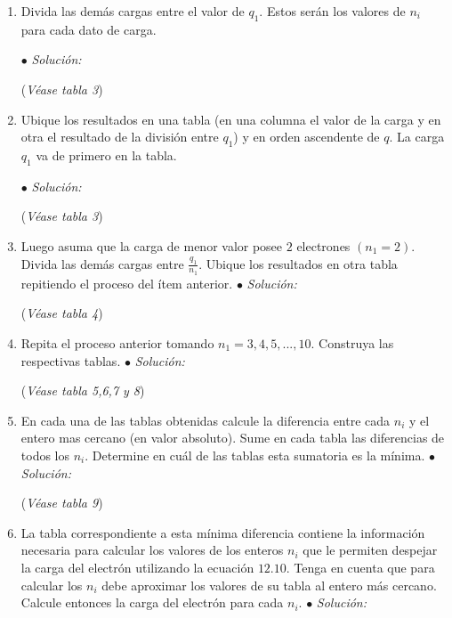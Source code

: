 \documentclass{article}
\begin{document}
\begin{enumerate}
    \item Divida las demás cargas entre el valor de $q_{1}$. Estos serán los valores de $n_{i}$ para cada dato de carga.\newline
    
$\bullet$ \emph{Solución: }\newline

(\emph{Véase tabla 3})

    \item Ubique los resultados en una tabla (en una columna el valor de la carga y en otra el resultado de la división entre $q_{1}$) y en orden ascendente de $q$. La carga $q_{1}$ va de primero en la tabla.\newline
    
$\bullet$ \emph{Solución: }\newline

(\emph{Véase tabla 3})



    \item Luego asuma que la carga de menor valor posee $2$ electrones $(n_{1} = 2)$. Divida las demás cargas entre $\frac{q_{1}}{n_{1}}$. Ubique los resultados en otra tabla repitiendo
    el proceso del ítem anterior.\newline
$\bullet$ \emph{Solución: }\newline

(\emph{Véase tabla 4})


    \item Repita el proceso anterior tomando $n_{1} = 3, 4, 5, ..., 10.$ Construya las respectivas
    tablas.\newline
$\bullet$ \emph{Solución: }\newline

(\emph{Véase tabla 5,6,7 y 8})


    \item En cada una de las tablas obtenidas calcule la diferencia entre cada $n_{i}$ y el entero mas cercano (en valor absoluto). Sume en cada tabla las diferencias de todos los $n_{i}$. Determine en cuál de las tablas esta sumatoria es la mínima.\newline
$\bullet$ \emph{Solución: }\newline

(\emph{Véase tabla 9})


    \item La tabla correspondiente a esta mínima diferencia contiene la información necesaria para calcular los valores de los enteros $n_{i}$ que le permiten despejar la carga del electrón utilizando la ecuación $12.10$. Tenga en cuenta que para calcular los $n_{i}$ debe aproximar los valores de su tabla al entero más cercano. Calcule entonces la carga del electrón para cada $n_{i}$.\newline
$\bullet$ \emph{Solución: }\newline


\end{enumerate}
\end{document}
